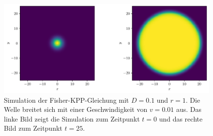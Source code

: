 \begin{figure}
    \centering
    \includegraphics[width=\textwidth]{papers/reaktdiff/images/Fisher_KPP/fisher_kpp_2d_wave_comparison.pdf}
    \caption{Simulation der Fisher-KPP-Gleichung mit \(D = 0.1\) und \(r = 1\). Die Welle breitet sich mit einer Geschwindigkeit von \(v = 0.01\) aus. Das linke Bild zeigt die Simulation zum Zeitpunkt \(t = 0\) und das rechte Bild zum Zeitpunkt \(t = 25\).}
    \label{reaktdiff:figure:fisher_kpp_simulation}
\end{figure}